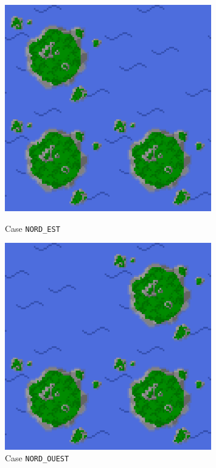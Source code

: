 \begin{figure}[h]
    \centering
    \begin{minipage}{0.23\textwidth}
        \centering
        \includegraphics[width=0.8\textwidth]{img/sprites/1.png}
        \caption*{Case \texttt{NORD\_EST}}
    \end{minipage}
    \begin{minipage}{0.23\textwidth}
        \centering
        \includegraphics[width=0.8\textwidth]{img/sprites/2.png}
        \caption*{Case \texttt{NORD\_OUEST}}
    \end{minipage}
    \begin{minipage}{0.23\textwidth}

\end{minipage}
\end{figure}
